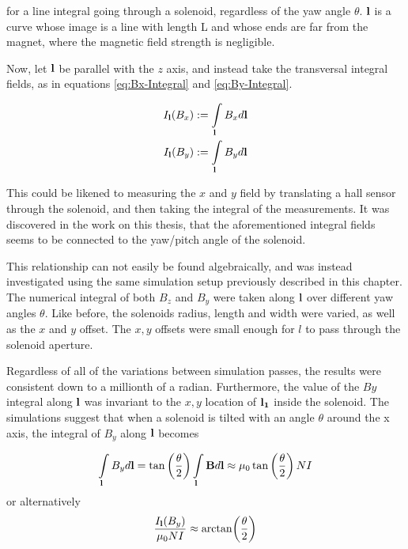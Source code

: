 for a line integral going through a solenoid, regardless of the yaw
angle $\theta$. $\vb{l}$ is a curve whose image
is a line with length L and whose ends are far from the magnet, where 
the magnetic field strength is negligible.

Now, let $\vb{l}$ be parallel with the $z$ axis, and instead take the
transversal integral fields, as in equations \ref{eq:Bx-Integral} and
\ref{eq:By-Integral}.

\begin{align}
    I_{\vb{l}}(B_x) &:= \int \limits_{\vb{l}} B_x d\vb{l} 
    \label{eq:Bx-Integral}\\
    I_{\vb{l}}(B_y) &:= \int \limits_{\vb{l}} B_y d\vb{l}
    \label{eq:By-Integral}
\end{align}

This could be
likened to measuring the $x$ and $y$ field by translating a hall sensor
through the solenoid, and then taking the integral of the measurements.
It was discovered in the work on this thesis, that the aforementioned
integral fields seems to be connected to the yaw/pitch angle of the 
solenoid.

This relationship can not easily
be found algebraically, and was instead investigated using the same
simulation setup previously described in this chapter. The numerical integral of
both $B_z$ and $B_y$ were taken along $\vb{l}$ over different yaw angles $\theta$.
Like before, the solenoids
radius, length and width were varied, as well as the $x$ and $y$ offset.
The $x, y$ offsets were small enough
for $l$ to pass through the solenoid aperture.

Regardless of all of the variations between simulation passes, the results were
consistent down to a millionth of a radian.
Furthermore, the value of the $By$ integral along $\vb{l}$
was invariant to the $x,y$ location of $\vb{l_1}$ inside the solenoid.
The simulations suggest that when a solenoid is tilted with an angle $\theta$
around the x axis, the integral of $B_y$ along $\vb{l}$ becomes

\begin{equation}
    \int\limits_{\vb{l}}B_y d\vb{l} =
    \tan\left( \frac{\theta}{2} \right)  \int\limits_{\vb{l}}\vb{B} d\vb{l}
    \approx \mu_0\tan\left( \frac{\theta}{2} \right) NI
    \label{eq:tanhalf}
\end{equation}
or alternatively
\begin{equation}
    \frac{I_{\vb{l}}(B_y)}{\mu_0NI} \approx \arctan(\frac{\theta}{2})
    \label{eq:Byint-Error}
\end{equation}

